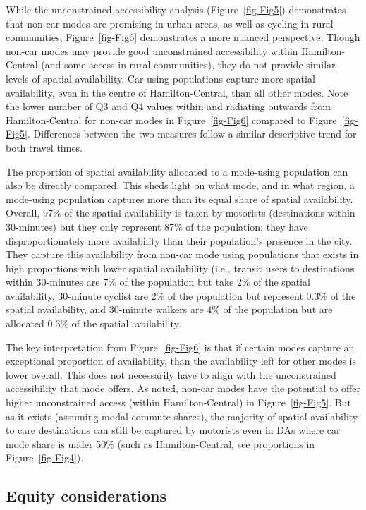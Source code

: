 \documentclass[
  authoryear,
  preprint,
  3p]{elsarticle}
\begin{document}
While the unconstrained accessibility analysis (Figure~\ref{fig-Fig5})
demonstrates that non-car modes are promising in urban areas, as well as
cycling in rural communities, Figure~\ref{fig-Fig6} demonstrates a more
nuanced perspective. Though non-car modes may provide good unconstrained
accessibility within Hamilton-Central (and some access in rural
communities), they do not provide similar levels of spatial
availability. Car-using populations capture more spatial availability,
even in the centre of Hamilton-Central, than all other modes. Note the
lower number of Q3 and Q4 values within and radiating outwards from
Hamilton-Central for non-car modes in Figure~\ref{fig-Fig6} compared to
Figure~\ref{fig-Fig5}. Differences between the two measures follow a
similar descriptive trend for both travel times.

The proportion of spatial availability allocated to a mode-using
population can also be directly compared. This sheds light on what mode,
and in what region, a mode-using population captures more than its equal
share of spatial availability. Overall, 97\% of the spatial availability
is taken by motorists (destinations within 30-minutes) but they only
represent 87\% of the population; they have disproportionately more
availability than their population's presence in the city. They capture
this availability from non-car mode using populations that exists in
high proportions with lower spatial availability (i.e., transit users to
destinations within 30-minutes are 7\% of the population but take 2\% of
the spatial availability, 30-minute cyclist are 2\% of the population
but represent 0.3\% of the spatial availability, and 30-minute walkers
are 4\% of the population but are allocated 0.3\% of the spatial
availability.

The key interpretation from Figure~\ref{fig-Fig6} is that if certain
modes capture an exceptional proportion of availability, than the
availability left for other modes is lower overall. This does not
necessarily have to align with the unconstrained accessibility that mode
offers. As noted, non-car modes have the potential to offer higher
unconstrained access (within Hamilton-Central) in Figure~\ref{fig-Fig5}.
But as it exists (assuming modal commute shares), the majority of
spatial availability to care destinations can still be captured by
motorists even in DAs where car mode share is under 50\% (such as
Hamilton-Central, see proportions in Figure~\ref{fig-Fig4}).

\hypertarget{equity-considerations}{%
\subsection{Equity considerations}\label{equity-considerations}}
\end{document}
